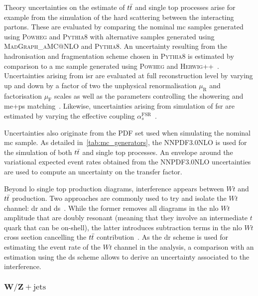  Theory uncertainties on the estimate of $t\bar{t}$ and single top processes arise for example from the simulation of the hard scattering between the interacting partons. These are evaluated by comparing the nominal \gls{mc} samples generated using \textsc{Powheg} and \textsc{Pythia8} with alternative samples generated using \textsc{MadGraph\_aMC@NLO} and \textsc{Pythia8}. An uncertainty resulting from the hadronisation and fragmentation scheme chosen in \textsc{Pythia8} is estimated by comparison to a \gls{mc} sample generated using \textsc{Powheg} and \textsc{Herwig++}~\cite{Herwig:2015jjp}. Uncertainties arising from \gls{isr} are evaluated at full reconstruction level by varying up and down by a factor of two the unphysical renormalisation $\mu_\mathrm{R}$ and factorisation $\mu_\mathrm{F}$ scales as well as the parameters controlling the showering and \gls{me}+\gls{ps} matching~\cite{ATL-PHYS-PUB-2016-004}. Likewise, uncertainties arising from simulation of \gls{fsr} are estimated by varying the effective coupling $\alpha_s^{\mathrm{FSR}}$~\cite{ATL-PHYS-PUB-2016-004}. 
 
 Uncertainties also originate from the \gls{PDF} set used when simulating the nominal \gls{mc} sample. As detailed in~\cref{tab:mc_generators}, the \textsc{NNPDF3.0NLO} is used for the simulation of both $t\bar{t}$ and single top processes. An envelope around the variational expected event rates obtained from the \textsc{NNPDF3.0NLO} uncertainties are used to compute an uncertainty on the transfer factor.
 
 Beyond \gls{lo} single top production diagrams, interference appears between $Wt$ and $t\bar{t}$ production. Two approaches are commonly used to try and isolate the $Wt$ channel: \gls{dr} and \gls{ds}~\cite{Frixione:2008yi}. While the former removes all diagrams in the \gls{nlo} $Wt$ amplitude that are doubly resonant (meaning that they involve an intermediate $t$ quark that can be on-shell), the latter introduces subtraction terms in the \gls{nlo} $Wt$ cross section cancelling the $t\bar{t}$ contribution~\cite{Frixione:2008yi}. As the \gls{dr} scheme is used for estimating the event rate of the $Wt$ channel in the analysis, a comparison with an estimation using the \gls{ds} scheme allows to derive an uncertainty associated to the interference.
  
 \subsubsection{$\boldsymbol{W/Z+\mathrm{jets}}$}
 
